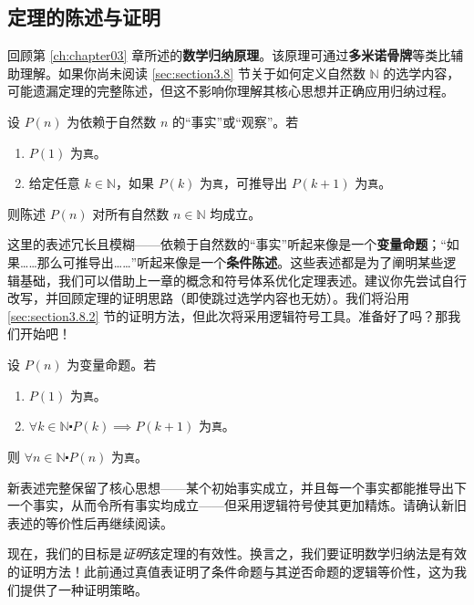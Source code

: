 \subsection{定理的陈述与证明}

回顾第 \ref{ch:chapter03} 章所述的\textbf{数学归纳原理}。该原理可通过\textbf{多米诺骨牌}等类比辅助理解。如果你尚未阅读 \ref{sec:section3.8} 节关于如何定义自然数 $\mathbb{N}$ 的选学内容，可能遗漏定理的完整陈述，但这不影响你理解其核心思想并正确应用归纳过程。

\begin{theorem}[数学归纳原理]
    设 $P(n)$ 为依赖于自然数 $n$ 的``事实''或``观察''。若
    \begin{enumerate}
        \item $P(1)$ 为\verb|真|。
        \item 给定任意 $k \in \mathbb{N}$，如果 $P(k)$ 为\verb|真|，可推导出 $P(k+1)$ 为\verb|真|。
    \end{enumerate}
    则陈述 $P(n)$ 对所有自然数 $n \in \mathbb{N}$ 均成立。
\end{theorem}

这里的表述冗长且模糊——依赖于自然数的``事实''听起来像是一个\textbf{变量命题}；``如果……那么可推导出……''听起来像是一个\textbf{条件陈述}。这些表述都是为了阐明某些逻辑基础，我们可以借助上一章的概念和符号体系优化定理表述。建议你先尝试自行改写，并回顾定理的证明思路（即使跳过选学内容也无妨）。我们将沿用 \ref{sec:section3.8.2} 节的证明方法，但此次将采用逻辑符号工具。准备好了吗？那我们开始吧！

\begin{theorem}[数学归纳原理]\label{theorem5.2.2}
    设 $P(n)$ 为变量命题。若
    \begin{enumerate}[label=(\arabic*)]
        \item $P(1)$ 为\verb|真|。
        \item $\forall k \in \mathbb{N} \centerdot P(k) \implies P(k+1)$ 为\verb|真|。
    \end{enumerate}
    则 $\forall n \in \mathbb{N} \centerdot P(n)$ 为\verb|真|。
\end{theorem}

新表述完整保留了核心思想——某个初始事实成立，并且每一个事实都能推导出下一个事实，从而令所有事实均成立——但采用逻辑符号使其更加精炼。请确认新旧表述的等价性后再继续阅读。

现在，我们的目标是\emph{证明}该定理的有效性。换言之，我们要证明数学归纳法是有效的证明方法！此前通过真值表证明了条件命题与其逆否命题的逻辑等价性，这为我们提供了一种证明策略。

